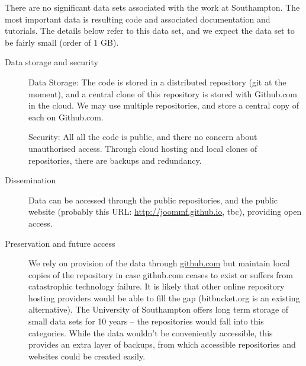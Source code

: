 \documentclass[12pt]{amsbook}
\begin{document}
There are no significant data sets associated with the work at Southampton. The most important data is resulting code and associated documentation and tutorials. The details below refer to this data set, and we expect the data set to be fairly small (order of 1 GB).
\begin{description}
\item[Data storage and security] Data Storage: The code is stored in a distributed repository (git at the moment), and a central clone of this repository is stored with Github.com in the cloud. We may use multiple repositories, and store a central copy of each on Github.com.

  Security: All all the code is public, and there no concern about unauthorised access. Through cloud hosting and local clones of repositories, there are backups and redundancy.
\item[Dissemination] Data can be accessed through the public repositories, and the public website (probably this URL: \href{http://joommf.github.io}{http://joommf.github.io}, tbc), providing open access.
\item[Preservation and future access] We rely on provision of the data through \href{github.com}{github.com} but maintain local copies of the repository in case github.com ceases to exist or suffers from catastrophic technology failure. It is likely that other online repository hosting providers would be able to fill the gap (bitbucket.org is an existing alternative). The University of Southampton offers long term storage of small data sets for 10 years -- the repositories would fall into this categories. While the data wouldn't be conveniently accessible, this provides an extra layer of backups, from which accessible repositories and websites could be created easily.
\end{description}
\end{document}
